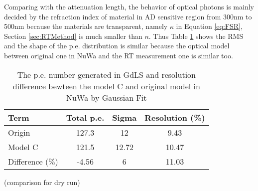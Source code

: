 Comparing with the attenuation length, the behavior of optical photons is mainly decided by the refraction index of material in AD sensitive
region from 300nm to 500nm because the materials are transparent, namely $\kappa$ in Equation \ref{eq:FSR}, Section \ref{sec:RTMethod}
is much smaller than $n$. Thus Table \ref{tab:peGenGdLSEER} shows the RMS
and the shape of the p.e. distribution is similar
because the optical model between original one in NuWa and the RT measurement one is similar too.


\begin{table}
\centering
\caption{The p.e. number generated in GdLS and resolution difference bewteen the model C and original model in NuWa by Gaussian Fit}
\label{tab:peGenGdLSEER}
\begin{tabular}{lccc}
Term & Total p.e. & Sigma & Resolution (\%) \\
\hline
\hline
Origin      & 127.3     & 12    & 9.43 \\
Model C     & 121.5     & 12.72 & 10.47 \\
\hline
Difference (\%) & -4.56 & 6     & 11.03 \\
\hline
\end{tabular}
\end{table}


(comparison for dry run)
